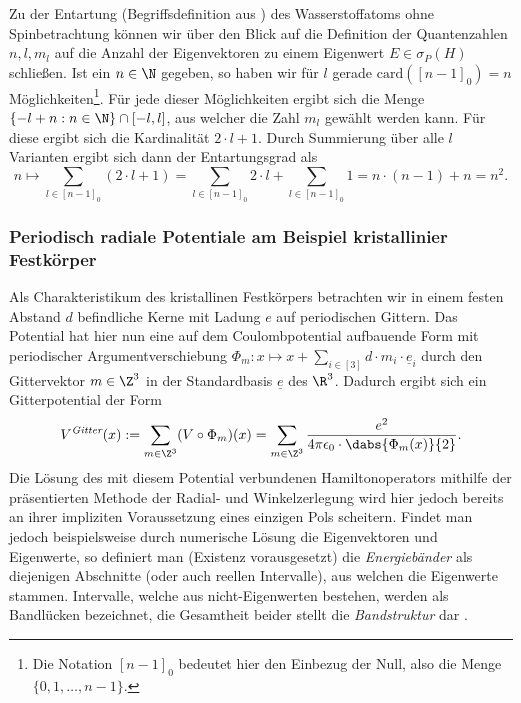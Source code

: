 \documentclass[../main.tex]{subfiles}
\begin{document}
            Zu der Entartung (Begriffsdefinition aus \cite[p.159]{demtröder51}) des Wasserstoffatoms ohne Spinbetrachtung können wir über den Blick auf die Definition der Quantenzahlen $n,l,m_l$ auf die Anzahl der Eigenvektoren zu einem Eigenwert $E\in\sigma_P(H)$ schließen. Ist ein $n\in\N$ gegeben, so haben wir für $l$ gerade $\text{card}([n-1]_0) = n$ Möglichkeiten\footnote{Die Notation $[n-1]_0$ bedeutet hier den Einbezug der Null, also die Menge $\{0,1,\dots,n-1\}$.}. Für jede dieser Möglichkeiten ergibt sich die Menge $\{-l+n:n\in\N\}\cap[-l,l]$, aus welcher die Zahl $m_l$ gewählt werden kann. Für diese ergibt sich die Kardinalität $2\cdot l + 1$. Durch Summierung über alle $l$ Varianten ergibt sich dann der Entartungsgrad als 
            \[
                n\mapsto \sum_{l\in[n-1]_0}(2\cdot l + 1) = \sum_{l\in[n-1]_0}2\cdot l + \sum_{l\in[n-1]_0}1 = n\cdot (n - 1) + n = n^2.
            \]
            
        \subsubsection{Periodisch radiale Potentiale am Beispiel kristallinier Festkörper}
            Als Charakteristikum des kristallinen Festkörpers betrachten wir in einem festen Abstand $d$ befindliche Kerne mit Ladung $e$ auf periodischen Gittern. Das Potential hat hier nun eine auf dem Coulombpotential aufbauende Form mit periodischer Argumentverschiebung $\Phi_m:x\mapsto x + \sum_{i\in[3]}d\cdot m_i\cdot \underline e_i$ durch den Gittervektor $m\in\Z^3$ in der Standardbasis $\underline e$ des $\R^3$. Dadurch ergibt sich ein Gitterpotential der Form
            \[
                V^\textit{Gitter}(x):= \sum_{m\in\Z^3}(V\circ\Phi_m)(x) = \sum_{m\in\Z^3}\frac{e^2}{4\pi\epsilon_0\cdot\dabs{\Phi_m(x)}{2}}.
            \]
            Die Lösung des mit diesem Potential verbundenen Hamiltonoperators mithilfe der präsentierten Methode der Radial- und Winkelzerlegung wird hier jedoch bereits an ihrer impliziten Voraussetzung eines einzigen Pols scheitern. Findet man jedoch beispielsweise durch numerische Lösung die Eigenvektoren und Eigenwerte, so definiert man (Existenz vorausgesetzt) die \emph{Energiebänder} als diejenigen Abschnitte (oder auch reellen Intervalle), aus welchen die Eigenwerte stammen. Intervalle, welche aus nicht-Eigenwerten bestehen, werden als Bandlücken bezeichnet, die Gesamtheit beider stellt die \emph{Bandstruktur} dar \cite{wiki:ElectronicBandStructure}.
\end{document}
